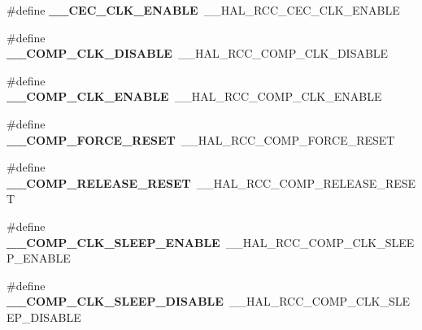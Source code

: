 \begin{DoxyCompactItemize}
\item 
\#define {\bfseries \+\_\+\+\_\+\+C\+E\+C\+\_\+\+C\+L\+K\+\_\+\+E\+N\+A\+B\+LE}~\+\_\+\+\_\+\+H\+A\+L\+\_\+\+R\+C\+C\+\_\+\+C\+E\+C\+\_\+\+C\+L\+K\+\_\+\+E\+N\+A\+B\+LE\hypertarget{group___h_a_l___r_c_c___aliased_gacd96e6033b91cf91492c3e1c69d4cdbd}{}\label{group___h_a_l___r_c_c___aliased_gacd96e6033b91cf91492c3e1c69d4cdbd}

\item 
\#define {\bfseries \+\_\+\+\_\+\+C\+O\+M\+P\+\_\+\+C\+L\+K\+\_\+\+D\+I\+S\+A\+B\+LE}~\+\_\+\+\_\+\+H\+A\+L\+\_\+\+R\+C\+C\+\_\+\+C\+O\+M\+P\+\_\+\+C\+L\+K\+\_\+\+D\+I\+S\+A\+B\+LE\hypertarget{group___h_a_l___r_c_c___aliased_gab36bc33375b159e27da274aa0a719371}{}\label{group___h_a_l___r_c_c___aliased_gab36bc33375b159e27da274aa0a719371}

\item 
\#define {\bfseries \+\_\+\+\_\+\+C\+O\+M\+P\+\_\+\+C\+L\+K\+\_\+\+E\+N\+A\+B\+LE}~\+\_\+\+\_\+\+H\+A\+L\+\_\+\+R\+C\+C\+\_\+\+C\+O\+M\+P\+\_\+\+C\+L\+K\+\_\+\+E\+N\+A\+B\+LE\hypertarget{group___h_a_l___r_c_c___aliased_ga27473848b33e4d60a45f8b426a9582b8}{}\label{group___h_a_l___r_c_c___aliased_ga27473848b33e4d60a45f8b426a9582b8}

\item 
\#define {\bfseries \+\_\+\+\_\+\+C\+O\+M\+P\+\_\+\+F\+O\+R\+C\+E\+\_\+\+R\+E\+S\+ET}~\+\_\+\+\_\+\+H\+A\+L\+\_\+\+R\+C\+C\+\_\+\+C\+O\+M\+P\+\_\+\+F\+O\+R\+C\+E\+\_\+\+R\+E\+S\+ET\hypertarget{group___h_a_l___r_c_c___aliased_gacf0479c92472c77e5b4016b57cd2a932}{}\label{group___h_a_l___r_c_c___aliased_gacf0479c92472c77e5b4016b57cd2a932}

\item 
\#define {\bfseries \+\_\+\+\_\+\+C\+O\+M\+P\+\_\+\+R\+E\+L\+E\+A\+S\+E\+\_\+\+R\+E\+S\+ET}~\+\_\+\+\_\+\+H\+A\+L\+\_\+\+R\+C\+C\+\_\+\+C\+O\+M\+P\+\_\+\+R\+E\+L\+E\+A\+S\+E\+\_\+\+R\+E\+S\+ET\hypertarget{group___h_a_l___r_c_c___aliased_gadee677453c7afbbae5acb992debe1e3b}{}\label{group___h_a_l___r_c_c___aliased_gadee677453c7afbbae5acb992debe1e3b}

\item 
\#define {\bfseries \+\_\+\+\_\+\+C\+O\+M\+P\+\_\+\+C\+L\+K\+\_\+\+S\+L\+E\+E\+P\+\_\+\+E\+N\+A\+B\+LE}~\+\_\+\+\_\+\+H\+A\+L\+\_\+\+R\+C\+C\+\_\+\+C\+O\+M\+P\+\_\+\+C\+L\+K\+\_\+\+S\+L\+E\+E\+P\+\_\+\+E\+N\+A\+B\+LE\hypertarget{group___h_a_l___r_c_c___aliased_ga7f3baf67404cc71a6c2b4e822daf84b4}{}\label{group___h_a_l___r_c_c___aliased_ga7f3baf67404cc71a6c2b4e822daf84b4}

\item 
\#define {\bfseries \+\_\+\+\_\+\+C\+O\+M\+P\+\_\+\+C\+L\+K\+\_\+\+S\+L\+E\+E\+P\+\_\+\+D\+I\+S\+A\+B\+LE}~\+\_\+\+\_\+\+H\+A\+L\+\_\+\+R\+C\+C\+\_\+\+C\+O\+M\+P\+\_\+\+C\+L\+K\+\_\+\+S\+L\+E\+E\+P\+\_\+\+D\+I\+S\+A\+B\+LE\hypertarget{group___h_a_l___r_c_c___aliased_ga4fdd3a1c0df6042d50c0a047a886f9db}{}\label{group___h_a_l___r_c_c___aliased_ga4fdd3a1c0df6042d50c0a047a886f9db}


\end{DoxyCompactItemize}
